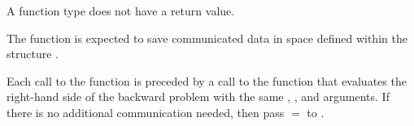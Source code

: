 {
  A  function type does not have a return value.
}
{
  The  function is expected to save communicated data in space defined within the
  structure . 

  Each call to the  function is preceded by a call to the function that 
  evaluates the right-hand side of the backward problem with the same , , 
  and  arguments. If there is no additional communication needed, then pass
   $=$  to .
}
